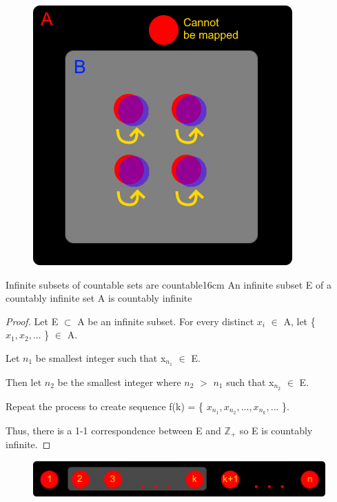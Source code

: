 	\begin{figure}[h]
		\centering
		\includegraphics[scale=0.4]{Images/4.1.4.png}
	\end{figure}

	\newpage



	\begin{wtheorem}{Infinite subsets of countable sets are countable}{16cm}
		An infinite subset E of a countably infinite set A is countably infinite
	\end{wtheorem}
	
	\begin{proof}
		Let E $\subset$ A be an infinite subset.
		For every distinct $x_i$ $\in$ A, let \{ $x_1, x_2, ...$ \} $\in$ A.

		Let $n_1$ be smallest integer such that x$_{n_1}$ $\in$ E.

		Then let $n_2$ be the smallest integer where $n_2$ $>$ $n_1$
		such that x$_{n_2}$ $\in$ E.

		Repeat the process to create sequence
		f(k) = \{ $x_{n_1}, x_{n_2}, ... , x_{n_k} , ...$ \}.

		Thus, there is a 1-1 correspondence between E and $\mathbb{Z}_+$ so
		E is countably infinite.
	\end{proof}



	\begin{figure}[h]
		\centering
		\includegraphics[scale=0.5]{Images/4.1.5.png}
	\end{figure}





